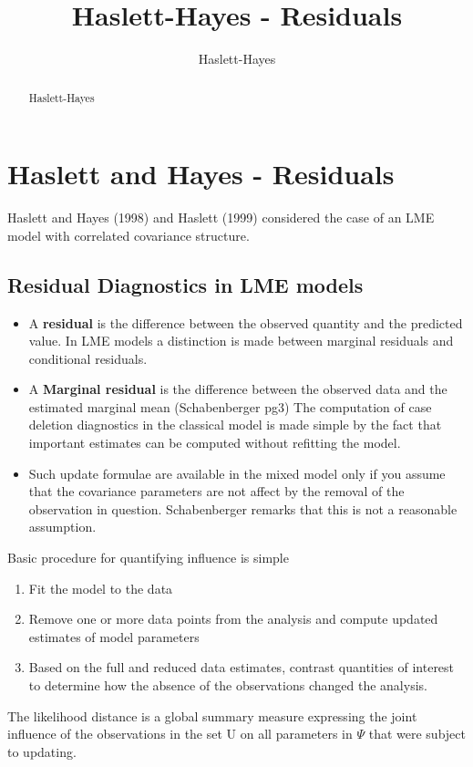 \documentclass[]{article}
\title{Haslett-Hayes - Residuals}
\author{Haslett-Hayes}
\begin{document}
\maketitle

\begin{abstract}
Haslett-Hayes
\end{abstract}
\section*{Haslett and Hayes - Residuals}
Haslett and Hayes (1998) and Haslett (1999) considered the case of an LME model with correlated covariance structure.

\subsection{Residual Diagnostics in LME models}
\begin{itemize}
\item A \textbf{residual} is the difference between the observed quantity and the predicted value. In LME models a distinction is made between marginal residuals and conditional residuals.

\item A \textbf{Marginal residual} is the difference between the observed data and the estimated marginal mean (Schabenberger  pg3)
The computation of case deletion diagnostics in the classical model is made simple by the fact that important estimates can be computed without refitting the model. 

\item Such update formulae are available in the mixed model only if you assume that the covariance parameters are not affect by the removal of the observation in question. Schabenberger remarks that this is not a reasonable assumption.

\end{itemize}


Basic procedure for quantifying influence is simple

\begin{enumerate}
\item  	Fit the model to the data
\item   	Remove one or more data points from the analysis and compute updated estimates of model parameters
\item  	Based on the full and reduced data estimates, contrast quantities of interest to determine how the absence of the observations changed the analysis.
\end{enumerate}
The likelihood distance is a global summary measure expressing the joint influence of the observations in the set U on all parameters in $\Psi$ that were subject to updating.
 
\end{document}
